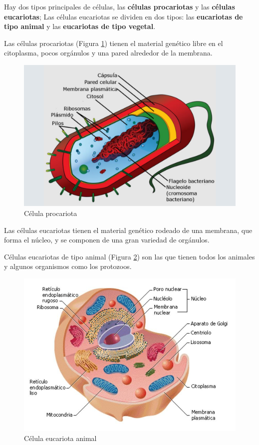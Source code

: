 Hay dos tipos principales de células, las \textbf{células procariotas} y las \textbf{células eucariotas}; Las células eucariotas se dividen en dos tipos: las \textbf{eucariotas de tipo animal} y las \textbf{eucariotas de tipo vegetal}.

\vspace{3mm}
Las células procariotas (Figura \ref{fig:celula-procariota}) tienen el material genético libre en el citoplasma, pocos orgánulos y una pared alrededor de la membrana.

\begin{figure}[ht]
    \centering
    \includegraphics[width=0.6\linewidth]{Tema1/01_Celula_procariota.jpg}
    \caption{Célula procariota}
    \label{fig:celula-procariota}
\end{figure}

Las células eucariotas tienen el material genético rodeado de una membrana, que forma el núcleo, y se componen de una gran variedad de orgánulos.

\vspace{3mm}
Células eucariotas de tipo animal (Figura \ref{fig:eucariota-animal}) son las que tienen todos los animales y algunos organismos
como los protozoos.

\begin{figure}[ht]
    \centering
    \includegraphics[width=0.6\linewidth]{Tema1/03_Celula_animal.jpg}
    \caption{Célula eucariota animal}
    \label{fig:eucariota-animal}
\end{figure}

